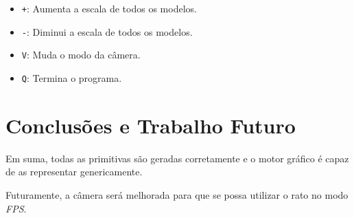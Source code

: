 \documentclass[a4paper]{article}
\begin{document}
\begin{itemize}
    \item \texttt{+}: Aumenta a escala de todos os modelos.
    \item \texttt{-}: Diminui a escala de todos os modelos.
    \item \texttt{V}: Muda o modo da câmera.
    \item \texttt{Q}: Termina o programa.
\end{itemize}

\section{Conclusões e Trabalho Futuro}
Em suma, todas as primitivas são geradas corretamente e o motor gráfico é capaz de as representar genericamente.

Futuramente, a câmera será melhorada para que se possa utilizar o rato no modo \textit{FPS}.
\end{document}
